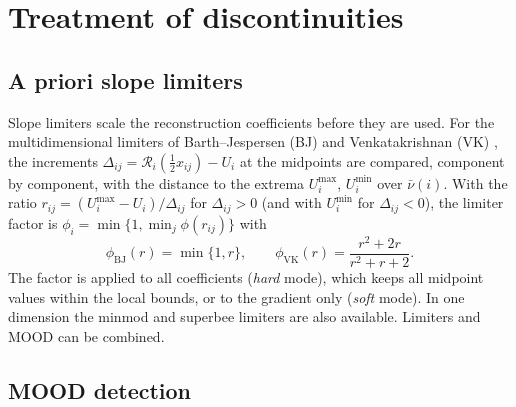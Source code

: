 \documentclass[11pt,a4paper]{article}
\numberwithin{equation}{section}
\newcommand{\cnb}{\bar\nu}
\begin{document}
\section{Treatment of discontinuities}\label{sec:mood}

\subsection{A priori slope limiters}\label{sec:limiters}

Slope limiters scale the reconstruction coefficients before they are used. For the multidimensional limiters of Barth--Jespersen (BJ) \cite{BarthJespersen1989} and Venkatakrishnan (VK) \cite{Venkatakrishnan1995}, the increments $\Delta_{ij}=\mathcal{R}_i(\tfrac12x_{ij})-U_i$ at the midpoints are compared, component by component, with the distance to the extrema $U^{\max}_i$, $U^{\min}_i$ over $\cnb(i)$. With the ratio $r_{ij}=(U^{\max}_i-U_i)/\Delta_{ij}$ for $\Delta_{ij}>0$ (and with $U^{\min}_i$ for $\Delta_{ij}<0$), the limiter factor is $\phi_i=\min\{1,\min_j\phi(r_{ij})\}$ with
\begin{equation}
\phi_{\mathrm{BJ}}(r)=\min\{1,r\},\qquad \phi_{\mathrm{VK}}(r)=\frac{r^2+2r}{r^2+r+2}.
\end{equation}
The factor is applied to all coefficients (\emph{hard} mode), which keeps all midpoint values within the local bounds, or to the gradient only (\emph{soft} mode). In one dimension the minmod and superbee limiters \cite{Roe1985,Sweby1984} are also available. Limiters and MOOD can be combined.

\subsection{MOOD detection}\label{sec:criteria}
\end{document}
